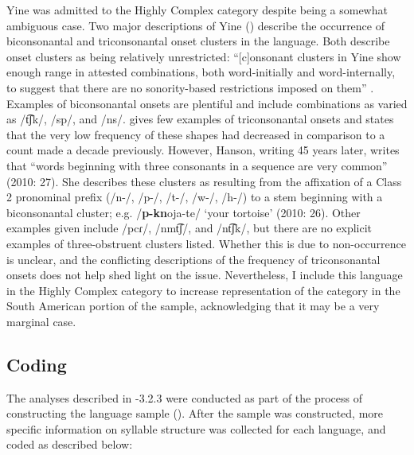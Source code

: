   Yine was admitted to the Highly Complex category despite being a somewhat ambiguous case. Two major descriptions of Yine (\citealt{Hanson2010,Matteson1965}) describe the occurrence of biconsonantal and triconsonantal onset clusters in the language. Both describe onset clusters as being relatively unrestricted: “[c]onsonant clusters in Yine show enough range in attested combinations, both word-initially and word-internally, to suggest that there are no sonority-based restrictions imposed on them” \citep[27]{Hanson2010}. Examples of biconsonantal onsets are plentiful and include combinations as varied as /t͡ʃk/, /sp/, and /ns/. \citet[24]{Matteson1965} gives few examples of triconsonantal onsets and states that the very low frequency of these shapes had decreased in comparison to a count made a decade previously. However, Hanson, writing 45 years later, writes that “words beginning with three consonants in a sequence are very common” (2010: 27). She describes these clusters as resulting from the affixation of a Class 2 pronominal prefix (/n-/, /p-/, /t-/, /w-/, /h-/) to a stem beginning with a biconsonantal cluster; e.g. /\textbf{p-kn}oja-te/ ‘your tortoise’ (2010: 26). Other examples given include /pcɾ/, /nmt͡ʃ/, and /nt͡ʃk/, but there are no explicit examples of three-obstruent clusters listed. Whether this is due to non-occurrence is unclear, and the conflicting descriptions of the frequency of triconsonantal onsets does not help shed light on the issue. Nevertheless, I include this language in the Highly Complex category to increase representation of the category in the South American portion of the sample, acknowledging that it may be a very marginal case.

\subsection{Coding}\label{sec:3.2.4}

  The analyses described in -3.2.3 were conducted as part of the process of constructing the language sample (). After the sample was constructed, more specific information on syllable structure was collected for each language, and coded as described below:

